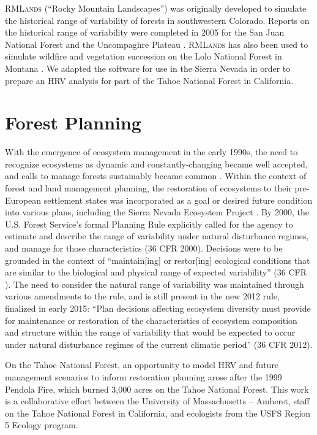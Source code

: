 \textsc{RMLands} (``Rocky Mountain Landscapes'') was originally developed to simulate the historical range of variability of forests in southwestern Colorado. Reports on the historical range of variability were completed in 2005 for the San Juan National Forest and the Uncompaghre Plateau \citep{McGarigal2005,McGarigal2005a}. \textsc{RMLands} has also been used to simulate wildfire and vegetation succession on the Lolo National Forest in Montana \citep{Cushman2011}. We adapted the software for use in the Sierra Nevada in order to prepare an HRV analysis for part of the Tahoe National Forest in California. 






\section{Forest Planning}

With the emergence of ecosystem management in the early 1990s, the need to recognize ecosystems as dynamic and constantly-changing became well accepted, and calls to manage forests sustainably became common \citep{Christensen1996}. Within the context of forest and land management planning, the restoration of ecosystems to their pre-European settlement states was incorporated as a goal or desired future condition into various plans, including the Sierra Nevada Ecosystem Project \cite{SNEP1996a}. By 2000, the U.S. Forest Service's formal Planning Rule explicitly called for the agency to estimate and describe the range of variability under natural disturbance regimes, and manage for those characteristics (36 CFR  2000). Decisions were to be grounded in the context of ``maintain[ing] or restor[ing] ecological conditions that are similar to the biological and physical range of expected variability'' (36 CFR ). The need to consider the natural range of variability was maintained through various amendments to the rule, and is still present in the new 2012 rule, finalized in early 2015: ``Plan decisions affecting ecosystem diversity must provide for maintenance or restoration of the characteristics of ecosystem composition and structure within the range of variability that would be expected to occur under natural disturbance regimes of the current climatic period'' (36 CFR  2012). 

On the Tahoe National Forest, an opportunity to model HRV and future management scenarios to inform restoration planning arose after the 1999 Pendola Fire, which burned 3,000 acres on the Tahoe National Forest. This work is a collaborative effort between the University of Massachusetts -- Amherst, staff on the Tahoe National Forest in California, and ecologists from the USFS Region 5 Ecology program.

